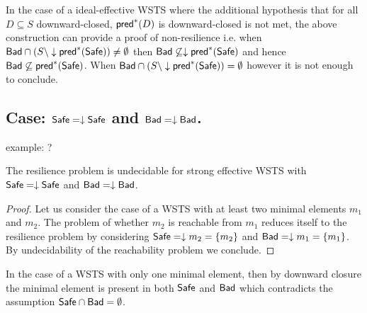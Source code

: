In the case
of a ideal-effective WSTS 
where
the additional hypothesis that
for all $D \subseteq S$ downward-closed, $\textsf{pred}^*(D)$ is downward-closed
is not met,
the above construction
can provide a proof
of non-resilience
i.e. when
$\textsf{Bad} \cap (S \setminus \downarrow\textsf{pred}^*(\textsf{Safe})) \neq \emptyset$
then
$\textsf{Bad} \not\subseteq \downarrow\textsf{pred}^*(\textsf{Safe})$
and hence
$\textsf{Bad} \not\subseteq \textsf{pred}^*(\textsf{Safe})$.
When $\textsf{Bad} \cap (S \setminus \downarrow\textsf{pred}^*(\textsf{Safe})) = \emptyset$
however
it is not enough to conclude.





\subsection{Case: $\textsf{Safe}=\downarrow \textsf{Safe}$ and $\textsf{Bad}=\downarrow \textsf{Bad}$.}

example: ?


\begin{theorem}\label{down-down}
The resilience problem is undecidable for strong effective WSTS with
$\textsf{Safe}=\downarrow \textsf{Safe}$
and $\textsf{Bad}=\downarrow \textsf{Bad}$.
\end{theorem}

\begin{proof}
Let us consider the case of a WSTS with at least two minimal elements $m_1$ and $m_2$.
The problem of whether $m_2$ is reachable from $m_1$ reduces itself to the resilience problem by considering $\textsf{Safe}=\downarrow m_2 = \{ m_2\}$ and $\textsf{Bad}=\downarrow m_1 = \{ m_1\}$. By undecidability of the reachability problem we conclude.  
\end{proof}

In the case of a WSTS with only one minimal element,  
then by downward closure the minimal element is present in both $\textsf{Safe}$ and $\textsf{Bad}$ which contradicts the assumption $\textsf{Safe} \cap \textsf{Bad}= \emptyset$.



